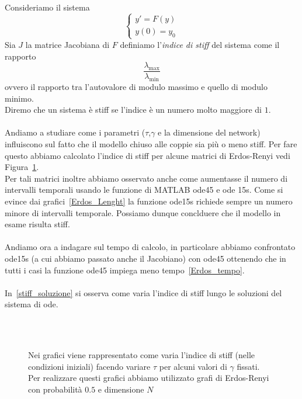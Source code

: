 \documentclass[11pt]{article}
\begin{document}
Consideriamo il sistema 
\begin{equation}
\begin{cases}
y'= F(y)\\
y(0 )=y_0 
\end{cases}	
\end{equation}
Sia $J$ la matrice Jacobiana di $F$ definiamo l'\textit{indice di stiff} del sistema come il rapporto 
$$ \frac{\lambda_{\max}}{\lambda_{\min}}$$ 
ovvero il rapporto tra l'autovalore di modulo massimo e quello di modulo minimo.\\
Diremo che un sistema \`e stiff se l'indice \`e un numero molto maggiore di $1$.\\ \\
Andiamo a studiare come i parametri ($\tau$,$\gamma$ e la dimensione del network) influiscono sul fatto che il modello chiuso alle coppie sia pi\`u o meno stiff. Per fare questo abbiamo calcolato l'indice di stiff per alcune matrici di Erdos-Renyi vedi Figura~\ref{Erdos}.\\
Per tali matrici inoltre abbiamo osservato anche come aumentasse il numero di intervalli temporali usando le funzione di MATLAB ode45 e ode 15s. Come si evince dai grafici~\ref{Erdos_Lenght} la funzione ode15s richiede sempre un numero minore di intervalli temporale. Possiamo dunque conclduere che il modello in esame risulta stiff.\\ \\
Andiamo ora a indagare sul tempo di calcolo, in particolare abbiamo confrontato ode15s (a cui abbiamo passato anche il Jacobiano) con ode45 ottenendo che in tutti i casi la funzione ode45 impiega meno tempo~\ref{Erdos_tempo}.\\ \\ 
In~\ref{stiff_soluzione} si osserva come varia l'indice di stiff lungo le soluzioni del sistema di ode.

\begin{figure}[h]
\centering
\subfloat[][$N=10$]
{\resizebox{0.45\textwidth}{!}{}}
 \hfill 
\subfloat[][$N=20$]
{\resizebox{0.45\textwidth}{!}{ }}  \\
\subfloat[][$N=30$]
{\resizebox{0.45\textwidth}{!}{}}
 \hfill 
\subfloat[][$N=40$]
{\resizebox{0.45\textwidth}{!}{ }}  \\
\subfloat[][$N=50$]
{\resizebox{0.45\textwidth}{!}{}}
 \hfill 
\subfloat[][$N=60$]
{\resizebox{0.45\textwidth}{!}{ }} 

\caption{Nei grafici viene rappresentato come varia l'indice di stiff (nelle condizioni iniziali)  facendo variare $\tau$ per alcuni valori di $\gamma$ fissati.\\
Per realizzare questi grafici abbiamo utilizzato grafi di Erdos-Renyi con probabilit\`a $0.5$ e dimensione $N$ }
\label{Erdos}
\end{figure}
\end{document}
